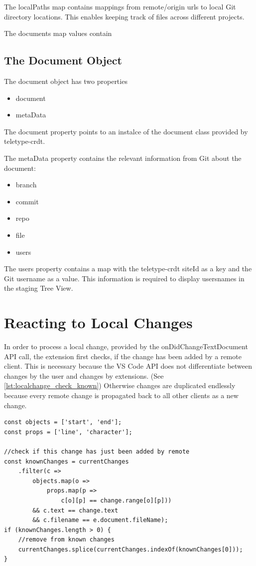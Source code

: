 The localPaths map contains mappings from remote/origin urls to local Git directory locations.
This enables keeping track of files across different projects.


The documents map values contain

\subsection{The Document Object}

The document object has two properties

\begin{itemize}
    \item document
    \item metaData
\end{itemize}

The document property points to an instalce of the document class provided by teletype-crdt.

The metaData property contains the relevant information from Git about the document:
\begin{itemize}
    \item branch
    \item commit
    \item repo
    \item file
    \item users
\end{itemize}

The users property contains a map with the teletype-crdt siteId as a key and the Git username as a value.
This information is required to display usersnames in the staging Tree View.

\section{Reacting to Local Changes}

In order to process a local change, provided by the onDidChangeTextDocument API call, the extension first checks, if the change has been added by a remote client. This is necessary because the VS Code API does not differentiate between changes by the user and changes by extensions. (See \ref{lst:localchange_check_known}) Otherwise changes are duplicated endlessly because every remote change is propagated back to all other clients as a new change.

\begin{lstlisting}[label={lst:localchange_check_known}, caption=Is this change already known to the data model? ]
const objects = ['start', 'end'];
const props = ['line', 'character'];

//check if this change has just been added by remote
const knownChanges = currentChanges
    .filter(c => 
        objects.map(o => 
            props.map(p => 
                c[o][p] == change.range[o][p])) 
        && c.text == change.text 
        && c.filename == e.document.fileName);
if (knownChanges.length > 0) {
    //remove from known changes
    currentChanges.splice(currentChanges.indexOf(knownChanges[0]));
}
\end{lstlisting}

